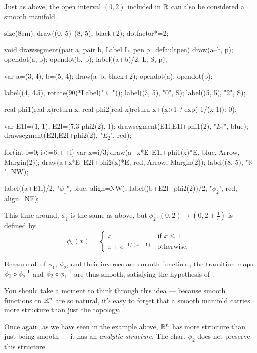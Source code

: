 \begin{example}
	Just as above, the open interval $(0, 2)$ included in $\mathbb R$ can also be considered a
	smooth manifold.
	\begin{center}
		\begin{asy}
			size(8cm);
			draw((0, 5)--(8, 5), black+2);
			dotfactor*=2;

			void drawsegment(pair a, pair b, Label L, pen p=defaultpen){
				draw(a--b, p); opendot(a, p); opendot(b, p);
				label((a+b)/2, L, S, p);
			}

			var a=(3, 4), b=(5, 4);
			draw(a--b, black+2); opendot(a); opendot(b);

			label((4, 4.5), rotate(90)*Label("$\subseteq$"));
			label((3, 5), "$0$", S);
			label((5, 5), "$2$", S);

			real phi1(real x){return x;}
			real phi2(real x){return x+(x>1 ? exp(-1/(x-1)): 0);}

			var E1l=(1, 1), E2l=(7.3-phi2(2), 1);
			drawsegment(E1l,E1l+phi1(2), "$E_1$", blue);
			drawsegment(E2l,E2l+phi2(2), "$E_2$", red);

			for(int i=0; i<=6;++i){
				var x=i/3;
				draw(a+x*E--E1l+phi1(x)*E, blue, Arrow, Margin(2));
				draw(a+x*E--E2l+phi2(x)*E, red, Arrow, Margin(2));
			}
			label((8, 5), "$\mathbb{R}$", NW);

			label((a+E1l)/2, "$\phi_1$", blue, align=NW);
			label((b+E2l+phi2(2))/2, "$\phi_2$", red, align=NE);
		\end{asy}
	\end{center}
	This time around, $\phi_1$ is the same as above, but
	$\phi_2 \colon (0, 2) \to (0, 2 + \frac{1}{e})$ is defined by
	\[ \phi_2(x) = \begin{cases}
		x & \text{if } x \leq 1 \\
		x + e^{-1/(x-1)} & \text{otherwise}.
	\end{cases} \]

	Because all of $\phi_1$, $\phi_2$, and their inverses are smooth functions, the transition maps
	$\phi_1 \circ \phi_2^{-1}$ and $\phi_2 \circ \phi_1^{-1}$ are thus smooth, satisfying
	the hypothesis of .
\end{example}

You should take a moment to think through this idea --- because smooth functions on $\mathbb R^n$ are so
natural, it's easy to forget that a smooth manifold carries more structure than just the topology.

Once again, as we have seen in the example above, $\mathbb R^n$ has more structure than just being smooth
--- it has an \emph{analytic structure}. The chart $\phi_2$ does not preserve this structure.

